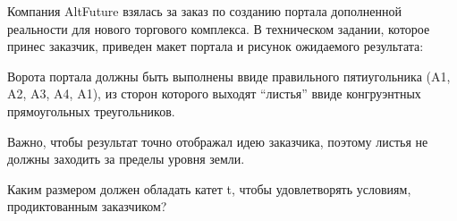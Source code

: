 
Компания AltFuture взялась за заказ по созданию портала дополненной реальности для нового торгового комплекса. 
В техническом задании, которое принес заказчик,  приведен макет портала и рисунок ожидаемого результата:


Ворота портала должны быть выполнены ввиде правильного пятиугольника (A1, A2, A3, A4, A1), из сторон которого выходят “листья” ввиде конгруэнтных  прямоугольных треугольников.

Важно, чтобы результат  точно отображал идею заказчика, поэтому листья не должны заходить за пределы уровня земли. 

Каким размером должен обладать катет t, чтобы удовлетворять условиям, продиктованным заказчиком?